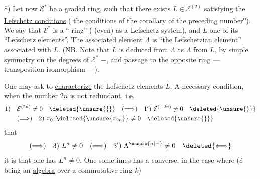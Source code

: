 8) Let now $\mathcal E^*$ be a graded ring,  such that there exists $L\in\mathcal E^{(2)}$ satisfying the \uline{Lefschetz conditions} ( the conditions of the corollary of the preceding number\textsuperscript{o}). We say that $\mathcal E^*$ is a `` ring'' (    (even) as a Lefschetz system), and $L$ one of its ``Lefschetz elements''.
The associated element $\Lambda$ is  ``the  Lefschetzian element'' associated with $L$.
(NB. Note that $L$ is deduced from $\Lambda$ as $\Lambda$ from $L$, by simple symmetry on the degrees of $\mathcal E^*$  $-$, and passage to the opposite ring ---  transposition isomorphism ---).

One may ask to \uline{characterize} the  Lefschetz elements $L$. A necessary condition, when the number $2n$ is not redundant, i.e.
\[
\begin{aligned}
1)\quad&\mathcal E^{(2n)}\neq0\quad\deleted{\unsure{\{}}\quad(\Longrightarrow)\quad1')\ \mathcal E^{(-2n)}\neq0\quad\deleted{\unsure{\}}}\\
&(\Longrightarrow)\quad2)\ \pi_0,\deleted{\unsure{\pi_{2n}}}\neq0\quad\deleted{\unsure{\}}}
\end{aligned}
\]
that
\[
(\Longrightarrow)\quad3)\ L^n\neq0\quad(\Longrightarrow)\quad3')\ \Lambda^{\unsure{n|-}}\neq0\quad\deleted{\Longleftrightarrow}
\]
it is that one has $L^n\neq0$. One sometimes has a converse, in the case where ($\mathcal E$ being an \uline{algebra} over a commutative ring $k$)
